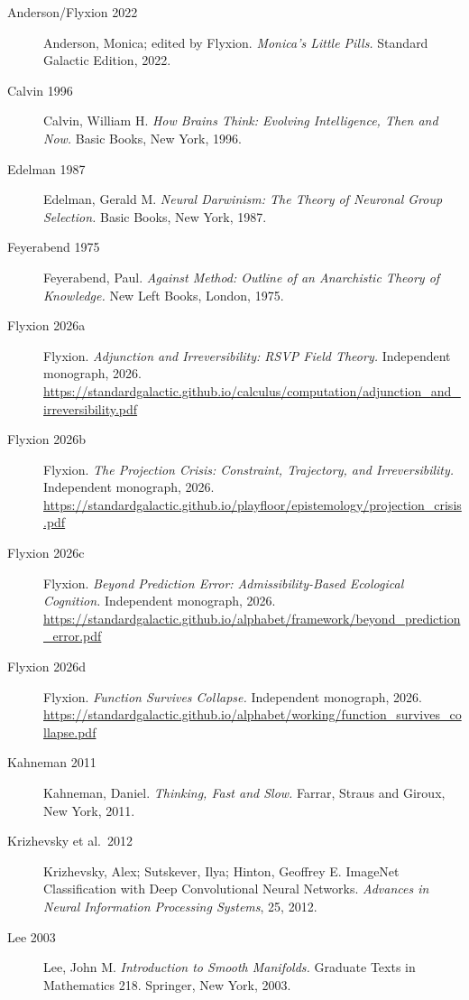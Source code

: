 \documentclass[12pt, a4paper, oneside]{book}
\begin{document}
\begin{description}
\item[Anderson/Flyxion 2022] Anderson, Monica; edited by Flyxion.
  \textit{Monica's Little Pills.} Standard Galactic Edition, 2022.

\item[Calvin 1996] Calvin, William H\@.
  \textit{How Brains Think: Evolving Intelligence, Then and Now.}
  Basic Books, New York, 1996.

\item[Edelman 1987] Edelman, Gerald M\@.
  \textit{Neural Darwinism: The Theory of Neuronal Group Selection.}
  Basic Books, New York, 1987.

\item[Feyerabend 1975] Feyerabend, Paul.
  \textit{Against Method: Outline of an Anarchistic Theory of Knowledge.}
  New Left Books, London, 1975.

\item[Flyxion 2026a] Flyxion.
  \textit{Adjunction and Irreversibility: RSVP Field Theory.}
  Independent monograph, 2026.
  \url{https://standardgalactic.github.io/calculus/computation/adjunction_and_irreversibility.pdf}

\item[Flyxion 2026b] Flyxion.
  \textit{The Projection Crisis: Constraint, Trajectory, and Irreversibility.}
  Independent monograph, 2026.
  \url{https://standardgalactic.github.io/playfloor/epistemology/projection_crisis.pdf}

\item[Flyxion 2026c] Flyxion.
  \textit{Beyond Prediction Error: Admissibility-Based Ecological Cognition.}
  Independent monograph, 2026.
  \url{https://standardgalactic.github.io/alphabet/framework/beyond_prediction_error.pdf}

\item[Flyxion 2026d] Flyxion.
  \textit{Function Survives Collapse.}
  Independent monograph, 2026.
  \url{https://standardgalactic.github.io/alphabet/working/function_survives_collapse.pdf}

\item[Kahneman 2011] Kahneman, Daniel.
  \textit{Thinking, Fast and Slow.}
  Farrar, Straus and Giroux, New York, 2011.

\item[Krizhevsky et al.\ 2012] Krizhevsky, Alex; Sutskever, Ilya;
  Hinton, Geoffrey E\@.
  ImageNet Classification with Deep Convolutional Neural Networks.
  \textit{Advances in Neural Information Processing Systems}, 25, 2012.

\item[Lee 2003] Lee, John M\@.
  \textit{Introduction to Smooth Manifolds.}
  Graduate Texts in Mathematics 218. Springer, New York, 2003.


\end{description}
\end{document}
